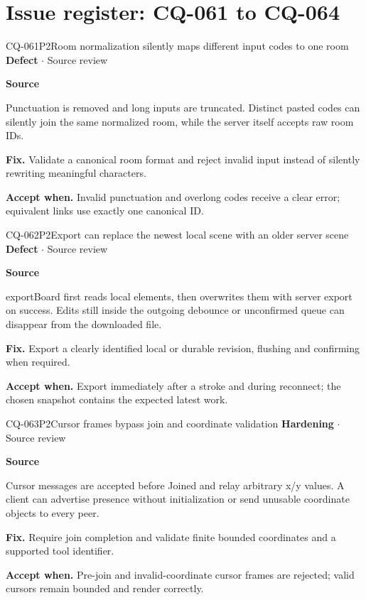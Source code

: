 \section*{Issue register: CQ-061 to CQ-064}
\begin{finding}{CQ-061}{P2}{Room normalization silently maps different input codes to one room}
\textbf{Defect} $\cdot$ Source review\par
\textbf{Source}\quad{}\par
Punctuation is removed and long inputs are truncated. Distinct pasted codes can silently join the same normalized room, while the server itself accepts raw room IDs.\par
\textbf{Fix.} Validate a canonical room format and reject invalid input instead of silently rewriting meaningful characters.\par
\textbf{Accept when.} Invalid punctuation and overlong codes receive a clear error; equivalent links use exactly one canonical ID.
\end{finding}
\begin{finding}{CQ-062}{P2}{Export can replace the newest local scene with an older server scene}
\textbf{Defect} $\cdot$ Source review\par
\textbf{Source}\quad{}\par
exportBoard first reads local elements, then overwrites them with server export on success. Edits still inside the outgoing debounce or unconfirmed queue can disappear from the downloaded file.\par
\textbf{Fix.} Export a clearly identified local or durable revision, flushing and confirming when required.\par
\textbf{Accept when.} Export immediately after a stroke and during reconnect; the chosen snapshot contains the expected latest work.
\end{finding}
\begin{finding}{CQ-063}{P2}{Cursor frames bypass join and coordinate validation}
\textbf{Hardening} $\cdot$ Source review\par
\textbf{Source}\quad{}\par
Cursor messages are accepted before Joined and relay arbitrary x/y values. A client can advertise presence without initialization or send unusable coordinate objects to every peer.\par
\textbf{Fix.} Require join completion and validate finite bounded coordinates and a supported tool identifier.\par
\textbf{Accept when.} Pre-join and invalid-coordinate cursor frames are rejected; valid cursors remain bounded and render correctly.
\end{finding}
